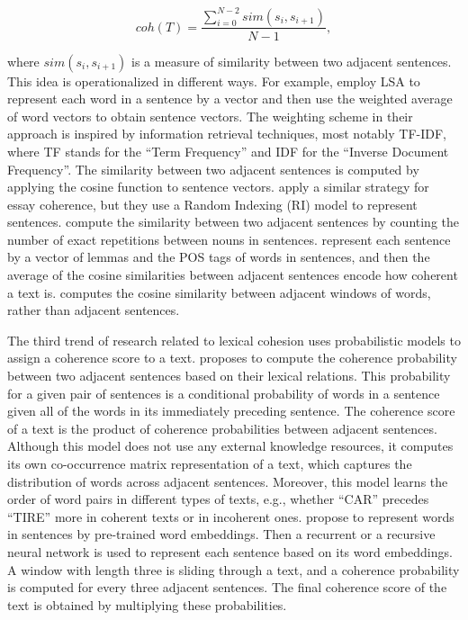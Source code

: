\begin{equation}
coh(T) = \frac{\sum_{i=0}^{N-2}sim(s_i,s_{i+1})}{N-1},
\end{equation} 

where $sim(s_i, s_{i+1})$ is a measure of similarity between two adjacent sentences. 
This idea is operationalized in different ways.
For example,  employ LSA to represent each word in a sentence by a vector and then use the weighted average of word vectors to obtain sentence vectors. 
The weighting scheme in their approach is inspired by information retrieval techniques, most notably TF-IDF, where TF stands for the ``Term Frequency'' and IDF for the ``Inverse Document Frequency''.
The similarity between two adjacent sentences is computed by applying the cosine function to sentence vectors. 
 apply a similar strategy for essay coherence, but they use a Random Indexing (RI) model to represent sentences. 
 compute the similarity between two adjacent sentences by counting the number of exact repetitions between nouns in sentences. 
 represent each sentence by a vector of lemmas and the POS tags of words in sentences, and then the average of the cosine similarities between adjacent sentences encode how coherent a text is.  
 computes the cosine similarity between adjacent windows of words, rather than adjacent sentences. 

The third trend of research related to lexical cohesion uses probabilistic models to assign a coherence score to a text. 
 proposes to compute the coherence probability between two adjacent sentences based on their lexical relations. 
This probability for a given pair of sentences is a conditional probability of words in a sentence given all of the words in its immediately preceding sentence. 
The coherence score of a text is the product of coherence probabilities between adjacent sentences. 
Although this model does not use any external knowledge resources, it computes its own co-occurrence matrix representation of a text, which captures the distribution of words across adjacent sentences. 
Moreover, this model learns the order of word pairs in different types of texts, e.g., whether ``CAR'' precedes ``TIRE'' more in coherent texts or in incoherent ones.  
 propose to represent words in sentences by pre-trained word embeddings. 
Then a recurrent \cite{schuster97} or a recursive neural network is used to represent each sentence based on its word embeddings. 
A window with length three is sliding through a text, and a coherence probability is computed for every three adjacent sentences.  
The final coherence score of the text is obtained by multiplying these probabilities. 

